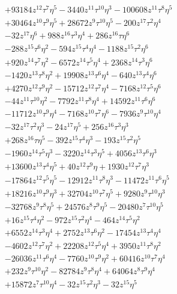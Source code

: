 {\begin{align*}
&+93184z^{12}\tau^{7}\eta^{5}-3440z^{11}\tau^{10}\eta^{3}-100608z^{11}\tau^{8}\eta^{5}\\
&+30464z^{10}\tau^{9}\eta^{5}+28672z^{9}\tau^{10}\eta^{5}-200z^{17}\tau^{2}\eta^{4}\\
&-32z^{17}\eta^{6}+988z^{16}\tau^{3}\eta^{4}+286z^{16}\tau\eta^{6}\\
&-288z^{15}\tau^{6}\eta^{2}-594z^{15}\tau^{4}\eta^{4}-1188z^{15}\tau^{2}\eta^{6}\\
&+920z^{14}\tau^{7}\eta^{2}-6572z^{14}\tau^{5}\eta^{4}+2368z^{14}\tau^{3}\eta^{6}\\
&-1420z^{13}\tau^{8}\eta^{2}+19908z^{13}\tau^{6}\eta^{4}-640z^{13}\tau^{4}\eta^{6}\\
&+4270z^{12}\tau^{9}\eta^{2}-15712z^{12}\tau^{7}\eta^{4}-7168z^{12}\tau^{5}\eta^{6}\\
&-44z^{11}\tau^{10}\eta^{2}-7792z^{11}\tau^{8}\eta^{4}+14592z^{11}\tau^{6}\eta^{6}\\
&-11712z^{10}\tau^{9}\eta^{4}-7168z^{10}\tau^{7}\eta^{6}-7936z^{9}\tau^{10}\eta^{4}\\
&-32z^{17}\tau^{2}\eta^{3}-24z^{17}\eta^{5}+256z^{16}\tau^{3}\eta^{3}\\
&+268z^{16}\tau\eta^{5}-392z^{15}\tau^{4}\eta^{3}-193z^{15}\tau^{2}\eta^{5}\\
&-1960z^{14}\tau^{5}\eta^{3}-3220z^{14}\tau^{3}\eta^{5}+4056z^{13}\tau^{6}\eta^{3}\\
&+13600z^{13}\tau^{4}\eta^{5}+40z^{12}\tau^{9}\eta+1930z^{12}\tau^{7}\eta^{3}\\
&-17864z^{12}\tau^{5}\eta^{5}-12912z^{11}\tau^{8}\eta^{3}-11472z^{11}\tau^{6}\eta^{5}\\
&+18216z^{10}\tau^{9}\eta^{3}+32704z^{10}\tau^{7}\eta^{5}+9280z^{9}\tau^{10}\eta^{3}\\
&-32768z^{9}\tau^{8}\eta^{5}+24576z^{8}\tau^{9}\eta^{5}-20480z^{7}\tau^{10}\eta^{5}\\
&+16z^{15}\tau^{4}\eta^{2}-972z^{15}\tau^{2}\eta^{4}-464z^{14}\tau^{5}\eta^{2}\\
&+6552z^{14}\tau^{3}\eta^{4}+2752z^{13}\tau^{6}\eta^{2}-17454z^{13}\tau^{4}\eta^{4}\\
&-4602z^{12}\tau^{7}\eta^{2}+22208z^{12}\tau^{5}\eta^{4}+3950z^{11}\tau^{8}\eta^{2}\\
&-26036z^{11}\tau^{6}\eta^{4}-7760z^{10}\tau^{9}\eta^{2}+60416z^{10}\tau^{7}\eta^{4}\\
&+232z^{9}\tau^{10}\eta^{2}-82784z^{9}\tau^{8}\eta^{4}+64064z^{8}\tau^{9}\eta^{4}\\
&+15872z^{7}\tau^{10}\eta^{4}-32z^{15}\tau^{2}\eta^{3}-32z^{15}\eta^{5}\\

\end{align*}}
